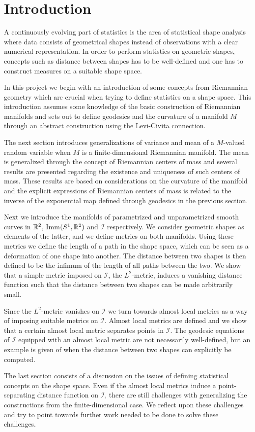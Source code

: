 \section*{Introduction}
\label{sec:introduction}

A continuously evolving part of statistics is the area of statistical shape analysis where data consists of geometrical shapes instead of observations with a clear numerical representation. In order to perform statistics on geometric shapes, concepts such as distance between shapes has to be well-defined and one has to construct measures on a suitable shape space.

In this project we begin with an introduction of some concepts from Riemannian geometry which are crucial when trying to define statistics on a shape space. This introduction assumes some knowledge of the basic construction of Riemannian manifolds and sets out to define geodesics and the curvature of a manifold $M$ through an abstract construction using the Levi-Civita connection.

The next section introduces generalizations of variance and mean of a $M$-valued random variable when $M$ is a finite-dimensional Riemannian manifold. The mean is generalized through the concept of Riemannian centers of mass and several results are presented regarding the existence and uniqueness of such centers of mass. These results are based on considerations on the curvature of the manifold and the explicit expressions of Riemannian centers of mass is related to the inverse of the exponential map defined through geodesics in the previous section.

Next we introduce the manifolds of parametrized and unparametrized smooth curves in $\mathbb{R}^2$, Imm$(S^1, \mathbb{R}^2)$ and $\mathcal{I}$ respectively. We consider geometric shapes as elements of the latter, and we define metrics on both manifolds. Using these metrics we define the length of a path in the shape space, which can be seen as a deformation of one shape into another. The distance between two shapes is then defined to be the infimum of the length of all paths between the two. We show that a simple metric imposed on $\mathcal{I}$, the $L^2$-metric, induces a vanishing distance function such that the distance between two shapes can be made arbitrarily small.

Since the $L^2$-metric vanishes on $\mathcal{I}$ we turn towards almost local metrics as a way of imposing suitable metrics on $\mathcal{I}$. Almost local metrics are defined and we show that a certain almost local metric separates points in $\mathcal{I}$. The geodesic equations of $\mathcal{I}$ equipped with an almost local metric are not necessarily well-defined, but an example is given of when the distance between two shapes can explicitly be computed.

The last section consists of a discussion on the issues of defining statistical concepts on the shape space. Even if the almost local metrics induce a point-separating distance function on $\mathcal{I}$, there are still challenges with generalizing the constructions from the finite-dimensional case. We reflect upon these challenges and try to point towards further work needed to be done to solve these challenges.
